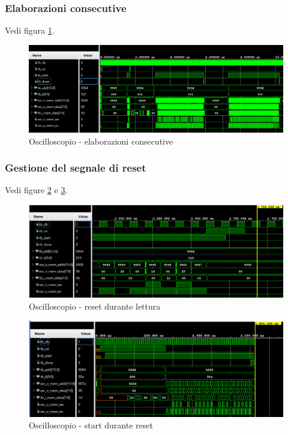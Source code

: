 \documentclass{article}
\begin{document}
\subsubsection{Elaborazioni consecutive}
Vedi figura \ref{fig:multi-start-tb}.
\begin{figure}
    \centering
    \includegraphics[width=1\linewidth]{tb/multi_start_tb.png}
    \caption{Oscilloscopio - elaborazioni consecutive}
    \label{fig:multi-start-tb}
\end{figure}

\subsubsection{Gestione del segnale di reset}
Vedi figure \ref{fig:reset-during-read-tb} e \ref{fig:start-during_reset_tb}.
\begin{figure}
    \centering
    \includegraphics[width=1\linewidth]{tb/reset_during_read_tb.png}
    \caption{Oscilloscopio - reset durante lettura}
    \label{fig:reset-during-read-tb}
\end{figure}
\begin{figure}
    \centering
    \includegraphics[width=1\linewidth]{tb/start_during_reset_tb.png}
    \caption{Oscilloscopio - start durante reset}
    \label{fig:start-during_reset_tb}
\end{figure}
\end{document}
